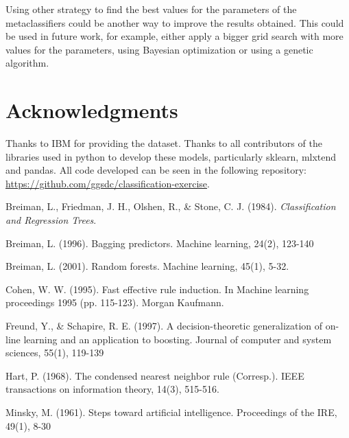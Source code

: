 \documentclass[a4paper,11pt]{article}
\begin{document}
Using other strategy to find the best values for the parameters of the metaclassifiers could be another way to improve the results obtained. This could be used in future work, for example, either apply a bigger grid search with more values for the parameters, using Bayesian optimization or using a genetic algorithm.



\section{Acknowledgments}

Thanks to IBM for providing the dataset.
Thanks to all contributors of the libraries used in python to develop these models, particularly sklearn, mlxtend and pandas.
All code developed can be seen in the following repository: \url{https://github.com/ggsdc/classification-exercise}.



\begin{thebibliography}{}

Breiman, L., Friedman, J. H., Olshen, R., \& Stone, C. J. (1984). \textit{Classification and Regression Trees}.

Breiman, L. (1996). Bagging predictors. Machine learning, 24(2), 123-140

Breiman, L. (2001). Random forests. Machine learning, 45(1), 5-32.

Cohen, W. W. (1995). Fast effective rule induction. In Machine learning proceedings 1995 (pp. 115-123). Morgan Kaufmann.

Freund, Y., \& Schapire, R. E. (1997). A decision-theoretic generalization of on-line learning and an application to boosting. Journal of computer and system sciences, 55(1), 119-139

Hart, P. (1968). The condensed nearest neighbor rule (Corresp.). IEEE transactions on information theory, 14(3), 515-516.

Minsky, M. (1961). Steps toward artificial intelligence. Proceedings of the IRE, 49(1), 8-30


\end{thebibliography}
\end{document}
